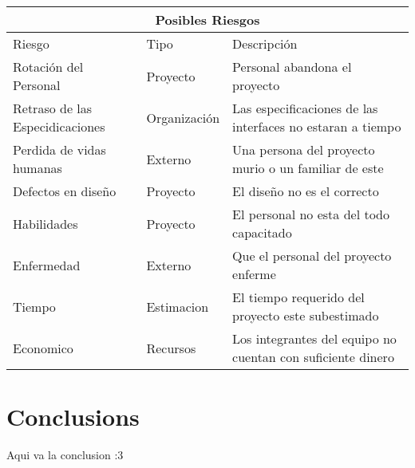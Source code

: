 \documentclass[12pt]{article}
\begin{document}
\begin{tabular}{ |p{4cm}||p{2.5cm}|p{6cm}|  }
 \hline
 \multicolumn{3}{|c|}{Posibles Riesgos} \\
 \hline
 Riesgo& Tipo & Descripción\\
 \hline
 Rotación del Personal& Proyecto&Personal abandona el proyecto\\
 Retraso de las Especidicaciones& Organización  & Las especificaciones de las interfaces no estaran a tiempo\\
 Perdida de vidas humanas &Externo & Una persona del proyecto murio o un familiar de este\\
 Defectos en diseño &Proyecto & El diseño no es el correcto\\
 Habilidades & Proyecto & El personal no esta del todo capacitado\\
 Enfermedad & Externo & Que el personal del proyecto enferme\\
 Tiempo & Estimacion & El tiempo requerido del proyecto este subestimado\\
 Economico & Recursos & Los integrantes del equipo no cuentan con suficiente dinero\\
 \hline
\end{tabular}

\section{Conclusions}\label{conclusions}
Aqui va la conclusion :3



\end{document}
